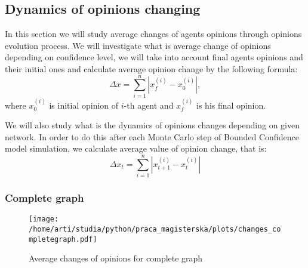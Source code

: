 \documentclass{article}
\begin{document}




\subsection{Dynamics of opinions changing}
In this section we will study average changes of agents opinions through opinions evolution process. We will investigate what is average change of opinions depending on confidence level, we will take into account final agents opinions and their initial ones and calculate average opinion change by the following formula:
\begin{equation}
\Delta x = \sum_{i=1}^n \left|x_{f}^{(i)} - x_0^{(i)} \right|,
\end{equation}
where $x_0^{(i)}$ is initial opinion of $i$-th agent and $x_{f}^{(i)}$ is his final opinion.

\indent

We will also study what is the dynamics of opinions changes depending on given network. In order to do this after each Monte Carlo step of Bounded Confidence model simulation, we calculate average value of opinion change, that is:
\begin{equation}
\Delta x_t = \sum_{i=1}^n \left|x_{t+1}^{(i)} - x_{t}^{(i)} \right|
\end{equation}



\subsubsection{Complete graph}

\begin{figure}[H]
		\centering
		\texttt{[image: /home/arti/studia/python/praca\_magisterska/plots/changes\_completegraph.pdf]}
		\caption{Average changes of opinions for complete graph}
\end{figure}
\end{document}
